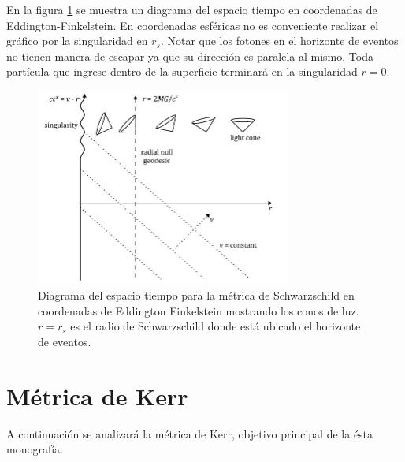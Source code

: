 \documentclass[12pt]{article}
\theoremstyle{plain}
\begin{document}
En la figura \ref{schwar_cone} se muestra un diagrama del espacio tiempo en coordenadas de Eddington-Finkelstein. En coordenadas esféricas no es conveniente realizar el gráfico por la singularidad en $r_s$. Notar que los fotones en el horizonte de eventos no tienen manera de escapar ya que su dirección es paralela al mismo. Toda partícula que ingrese dentro de la superficie terminará en la singularidad $r=0$. 

\begin{figure}[H]
\centering
\includegraphics[width=0.75\textwidth]{schwar_cone.JPG}
\caption{Diagrama del espacio tiempo para la métrica de Schwarzschild en coordenadas de Eddington Finkelstein mostrando los conos de luz. $r=r_s$ es el radio de Schwarzschild donde está ubicado el horizonte de eventos.}
\label{schwar_cone}
\end{figure}

\section{Métrica de Kerr}
A continuación se analizará la métrica de Kerr, objetivo principal de la ésta monografía.
\end{document}
